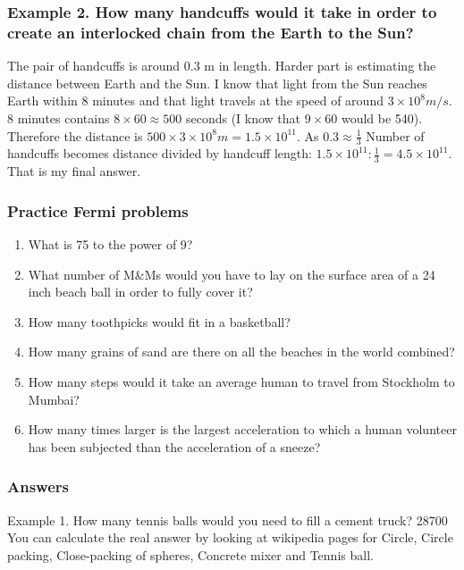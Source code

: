 \documentclass[pdftex, 12pt, a4paper]{report}
\begin{document}
	\subsubsection{Example 2. How many handcuffs would it take in order to create an interlocked chain from the Earth to the Sun?}
	
	The pair of handcuffs is around 0.3 m in length. Harder part is estimating the distance between Earth and the Sun. I know that light from the Sun reaches Earth within 8 minutes and that light travels at the speed of around $3\times 10^8 m/s$. 8 minutes contains $8\times60 \approx 500$ seconds (I know that $9 \times 60$ would be 540). Therefore the distance is $500 \times 3 \times 10^8 m = 1.5 \times 10^{11}$. As $0.3 \approx \frac{1}{3}$ Number of handcuffs becomes distance divided by handcuff length: $1.5\times 10^{11} : \frac{1}{3} = 4.5 \times 10^{11}$. That is my final answer.\newline\newline
	
	\subsubsection{Practice Fermi problems}
	\begin{enumerate}
			\item What is 75 to the power of 9? 
			\item What number of M\&Ms would you have to lay on the surface area of a 24 inch beach ball in order to fully cover it? 
			\item How many toothpicks would fit in a basketball?
			\item How many grains of sand are there on all the beaches in the world combined?
			\item How many steps would it take an average human to travel from Stockholm to Mumbai?
			\item How many times larger is the largest acceleration to which a human volunteer has been subjected than the acceleration of a sneeze? 
	\end{enumerate}
	\newpage
	\subsubsection{Answers}
	
	Example 1. How many tennis balls would you need to fill a cement truck? 28700\newline
	You can calculate the real answer by looking at wikipedia pages for Circle, Circle packing, Close-packing of spheres, Concrete mixer and Tennis ball. \newline\newline
	
\end{document}

